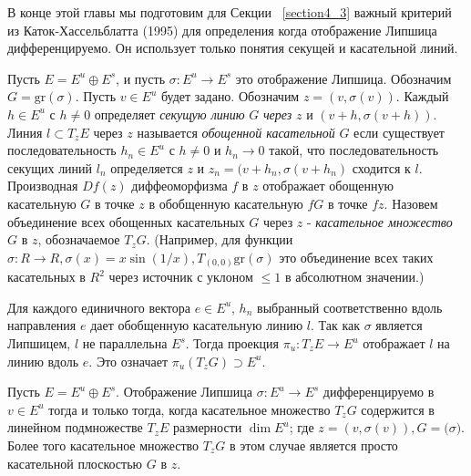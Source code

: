 В конце этой главы мы подготовим для Секции ~\ref{section4_3} важный критерий из Каток-Хассельблатта (1995) для определения когда отображение Липшица дифференцируемо. Он использует только понятия секущей и касательной линий. 

Пусть $E=E^u \oplus E^s$, и пусть $\sigma : E^u \rightarrow E^s$ это отображение Липшица. Обозначим $G = \mathrm{gr}(\sigma)$. Пусть $v \in E^u$ будет задано. Обозначим $z=(v,\sigma(v))$. Каждый $h\in E^u$ с $h \neq 0$ определяет \textit{секущую линию} $G$ \textit{через} $z$ и $(v+h, \sigma(v+h))$. Линия $l \subset T_zE$ через $z$ называется \textit{обощенной касательной} $G$ если существует последовательность $h_n \in E^u$ с $h \neq 0$ и $h_n \rightarrow 0$ такой, что последовательность секущих линий $l_n$ определяется $z$ и $z_n=(v+h_n, \sigma(v+h_n)$ сходится к $l$. Производная $Df(z)$ диффеоморфизма $f$ в $z$ отображает обощенную касательную $G$ в точке $z$ в обобщенную касательную $fG$ в точке $fz$. Назовем объединение всех обощенных касательных $G$ через $z$ - \textit{касательное множество} $G$ в $z$, обозначаемое $T_zG$. (Например, для функции $\sigma : R \rightarrow R, \sigma(x) = x \sin (1/x), T_{(0,0)}\mathrm{gr}(\sigma)$ это объединение всех таких касательных в $R^2$ через  источник с уклоном $\leq 1$ в абсолютном значении.)

Для каждого единичного вектора $e \in E^u$, $h_n$ выбранный соответственно вдоль направления $e$ дает обобщенную касательную линию $l$. Так как $\sigma$ является Липшицем, $l$ не параллельна $E^s$. Тогда проекция $\pi_u : T_zE \rightarrow E^u$ отображает $l$ на линию  вдоль $e$. Это означает $\pi_u (T_zG) \supset E^u$.

\begin{criteria}
Пусть $E=E^u \oplus E^s$. Отображение Липшица $\sigma : E^u \rightarrow E^s$ дифференцируемо в $v \in E^u$ тогда и только тогда, когда касательное множество $T_zG$ содержится в линейном подмножестве $T_zE$ размерности $\dim E^u$; где $z=(v,\sigma(v)), G=\mathrm(\sigma)$. Более того касательное множество $T_zG$ в этом случае является просто касательной плоскостью $G$ в $z$.
\end{criteria}
